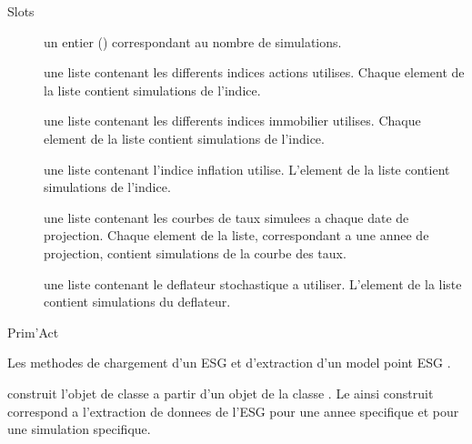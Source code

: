 \documentclass[a4paper]{book}
\begin{document}
\begin{Section}{Slots}

\begin{description}

\item[] un entier () correspondant au nombre de simulations.

\item[] une liste contenant les differents indices actions utilises. Chaque element de la liste contient
 simulations de l'indice.

\item[] une liste contenant les differents indices immobilier utilises. Chaque element de la liste contient
 simulations de l'indice.

\item[] une liste contenant l'indice inflation utilise. L'element de la liste contient
 simulations de l'indice.

\item[] une liste contenant les courbes de taux simulees a chaque date de projection. Chaque element
de la liste, correspondant a une annee de projection, contient  simulations de la courbe des taux.

\item[] une liste contenant le deflateur stochastique a utiliser. L'element de la liste contient
 simulations du deflateur.

\end{description}
\end{Section}
%
\begin{Author}\relax
Prim'Act
\end{Author}
%
\begin{SeeAlso}\relax
Les methodes de chargement d'un ESG  et d'extraction d'un model point
ESG .
\end{SeeAlso}
%
\begin{Description}\relax
{} construit l'objet de classe  a partir d'un objet
de la classe .
Le  ainsi construit correspond a l'extraction de donnees de l'ESG
pour une annee specifique et pour une simulation specifique.
\end{Description}
\end{document}
